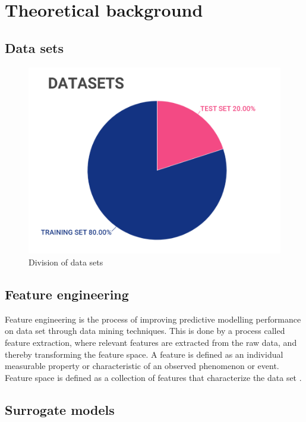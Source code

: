 \section{Theoretical background}
\label{sec:background}

\subsection{Data sets}
\label{subsec:Datasets}

\begin{figure}[h!]
\centering
\includegraphics[scale=0.45]{Images/2_theory/datasets.PNG}
\caption{Division of data sets}
\label{fig:datasets}
\end{figure}

\subsection{Feature engineering}
\label{subsec:feature_eng}
Feature engineering is the process of improving predictive modelling performance on data set through data mining techniques. This is done by a process called feature extraction, where relevant features are extracted from the raw data, and thereby transforming the feature space. A feature is defined as an individual measurable property or characteristic of an observed phenomenon or event. Feature space is defined as a collection of features that characterize the data set \cite{Bishop}.


\subsection{Surrogate models}

